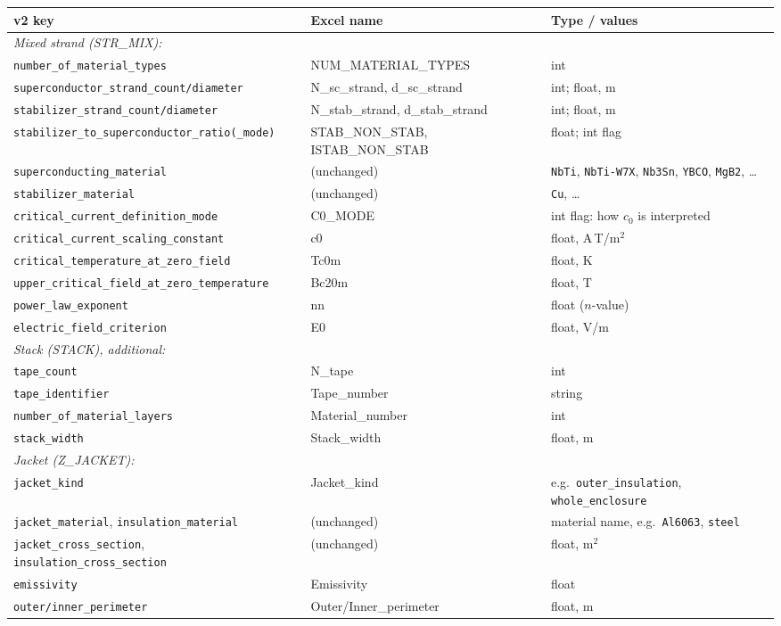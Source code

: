 \documentclass[10pt,a4paper]{article}
\newcommand{\code}[1]{\texttt{#1}}
\begin{document}
\begin{longtable}{p{5.8cm}p{3.2cm}p{6.2cm}}
\toprule
\textbf{v2 key} & \textbf{Excel name} & \textbf{Type / values} \\
\midrule
\endhead
\multicolumn{3}{l}{\emph{Mixed strand (STR\_MIX):}} \\
\code{number\_of\_material\_types} & NUM\_MATERIAL\_TYPES & int \\
\code{superconductor\_strand\_count/diameter} & N\_sc\_strand, d\_sc\_strand & int; float, m \\
\code{stabilizer\_strand\_count/diameter} & N\_stab\_strand, d\_stab\_strand & int; float, m \\
\code{stabilizer\_to\_superconductor\_ratio(\_mode)} & STAB\_NON\_STAB, ISTAB\_NON\_STAB & float; int flag \\
\code{superconducting\_material} & (unchanged) & \code{NbTi}, \code{NbTi-W7X}, \code{Nb3Sn}, \code{YBCO}, \code{MgB2}, \dots \\
\code{stabilizer\_material} & (unchanged) & \code{Cu}, \dots \\
\code{critical\_current\_definition\_mode} & C0\_MODE & int flag: how $c_0$ is interpreted \\
\code{critical\_current\_scaling\_constant} & c0 & float, A\,T/m$^2$ \\
\code{critical\_temperature\_at\_zero\_field} & Tc0m & float, K \\
\code{upper\_critical\_field\_at\_zero\_temperature} & Bc20m & float, T \\
\code{power\_law\_exponent} & nn & float ($n$-value) \\
\code{electric\_field\_criterion} & E0 & float, V/m \\
\multicolumn{3}{l}{\emph{Stack (STACK), additional:}} \\
\code{tape\_count} & N\_tape & int \\
\code{tape\_identifier} & Tape\_number & string \\
\code{number\_of\_material\_layers} & Material\_number & int \\
\code{stack\_width} & Stack\_width & float, m \\
\multicolumn{3}{l}{\emph{Jacket (Z\_JACKET):}} \\
\code{jacket\_kind} & Jacket\_kind & e.g.\ \code{outer\_insulation}, \code{whole\_enclosure} \\
\code{jacket\_material}, \code{insulation\_material} & (unchanged) & material name, e.g.\ \code{Al6063}, \code{steel} \\
\code{jacket\_cross\_section}, \code{insulation\_cross\_section} & (unchanged) & float, m$^2$ \\
\code{emissivity} & Emissivity & float \\
\code{outer/inner\_perimeter} & Outer/Inner\_perimeter & float, m \\
\bottomrule
\end{longtable}
\end{document}
